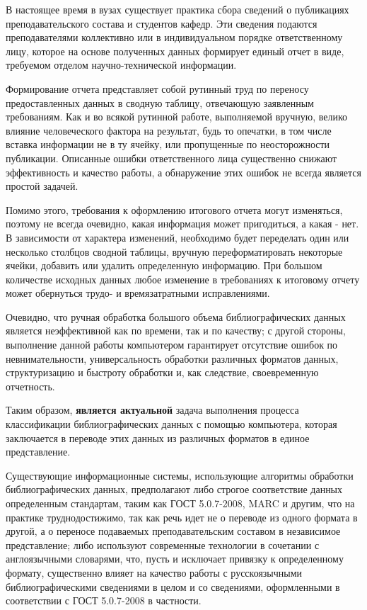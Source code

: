 \Introduction
 
В настоящее время в вузах существует практика сбора сведений о публикациях преподавательского состава и студентов кафедр. Эти сведения подаются преподавателями коллективно или в индивидуальном порядке ответственному лицу, которое на основе полученных данных формирует единый отчет в виде, требуемом отделом научно-технической информации.

Формирование отчета представляет собой рутинный труд по переносу предоставленных данных в сводную таблицу, отвечающую заявленным требованиям. Как и во всякой рутинной работе, выполняемой вручную, велико влияние человеческого фактора на результат, будь то опечатки, в том числе вставка информации не в ту ячейку, или пропущенные по неосторожности публикации. Описанные ошибки ответственного лица существенно снижают эффективность и качество работы, а обнаружение этих ошибок не всегда является простой задачей.

Помимо этого, требования к оформлению итогового отчета могут изменяться, поэтому не всегда очевидно, какая информация может пригодиться, а какая - нет. В зависимости от характера изменений, необходимо будет переделать один или несколько столбцов сводной таблицы, вручную переформатировать некоторые ячейки, добавить или удалить определенную информацию. При большом количестве исходных данных любое изменение в требованиях к итоговому отчету может обернуться трудо- и времязатратными  исправлениями.

Очевидно, что ручная обработка большого объема библиографических данных является неэффективной как по времени, так и по качеству; с другой стороны, выполнение данной работы компьютером гарантирует отсутствие ошибок по невнимательности, универсальность обработки различных форматов данных, структуризацию и быстроту обработки и, как следствие, своевременную отчетность.

Таким образом, \textbf{является актуальной} задача выполнения процесса классификации библиографических данных с помощью компьютера, которая заключается в переводе этих данных из различных форматов в единое представление.
 
Существующие информационные системы, использующие алгоритмы обработки библиографических данных, предполагают либо строгое соответствие данных определенным стандартам, таким как ГОСТ 5.0.7-2008, MARC и другим, что на практике труднодостижимо, так как речь идет не о переводе из одного формата в другой, а о переносе подаваемых преподавательским составом в независимое представление; либо используют современные технологии в сочетании с англоязычными словарями, что, пусть и исключает привязку к определенному формату, существенно влияет на качество работы с русскоязычными библиографическими сведениями в целом и со сведениями, оформленными в соответствии с ГОСТ 5.0.7-2008 в частности.

